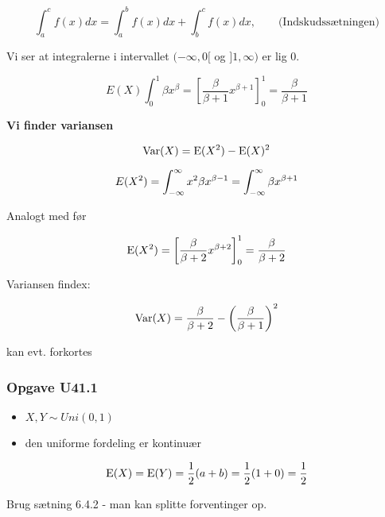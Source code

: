 \begin{equation}
    \int_a^c f(x) dx = \int_a^b f(x) dx + \int_b^c f(x)dx,\qquad  \text{(Indskudssætningen)}
\end{equation}

Vi ser at integralerne i intervallet $(-\infty, 0[$ og $]1, \infty)$ er lig $0$.

\begin{equation}
    E(X) \int_{0}^{1} \beta x^\beta = \left[ \frac{\beta}{\beta + 1} x^{\beta + 1}  \right]_{0}^{1} = \frac{\beta}{\beta + 1}
\end{equation}


\textbf{Vi finder variansen}

\begin{equation}
    \text{Var}(X) = \text{E}(X^2) - \text{E}(X)^2
\end{equation}

\begin{equation}
    E(X^2) =\int_{-\infty}^{\infty} x^2 \beta x^{\beta -1}  = \int_{-\infty}^{\infty} \beta x^{\beta + 1}
\end{equation}

Analogt med før

\begin{equation}
    \text{E}(X^2) = \left[ \frac{\beta}{\beta + 2} x^{\beta + 2}  \right]_{0}^{1} = \frac{\beta}{\beta + 2}
\end{equation}

Variansen findex:

\begin{equation}
    \text{Var}(X) = \frac{\beta}{\beta + 2} - \left( \frac{\beta}{\beta + 1} \right)^2
\end{equation}

kan evt. forkortes

\subsubsection{Opgave U41.1}

\begin{itemize}
    \item $X, Y \sim Uni(0,1)$
    \item den uniforme fordeling er kontinuær
\end{itemize}

\begin{equation}
    \text{E}(X) = \text{E}(Y) = \frac{1}{2}(a+b) = \frac{1}{2}(1 + 0) = \frac{1}{2}    
\end{equation}

Brug sætning 6.4.2 - man kan splitte forventinger op.


